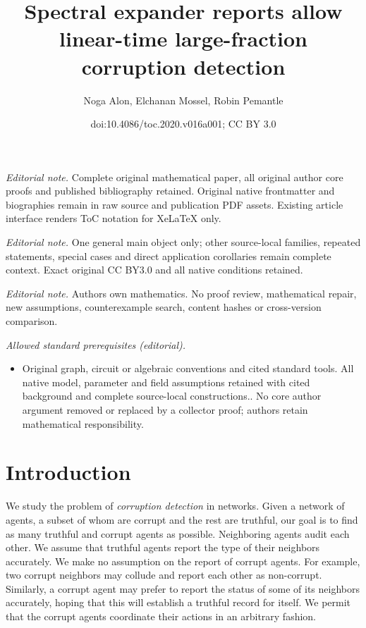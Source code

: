 \documentclass[11pt]{article}
\title{Spectral expander reports allow linear-time large-fraction corruption detection}
\author{Noga Alon, Elchanan Mossel, Robin Pemantle}
\date{doi:10.4086/toc.2020.v016a001; CC BY 3.0}
\numberwithin{equation}{section}
\theoremstyle{definition}
\theoremstyle{plain}
\begin{document}
\maketitle
\noindent\textit{Editorial note.} Complete original mathematical paper, all original author core proofs and published bibliography retained. Original native frontmatter and biographies remain in raw source and publication PDF assets. Existing article interface renders ToC notation for XeLaTeX only.\par\medskip
\noindent\textit{Editorial note.} One general main object only; other source-local families, repeated statements, special cases and direct application corollaries remain complete context. Exact original CC BY3.0 and all native conditions retained.\par\medskip
\noindent\textit{Editorial note.} Authors own mathematics. No proof review, mathematical repair, new assumptions, counterexample search, content hashes or cross-version comparison.\par\medskip
\noindent\textit{Allowed standard prerequisites (editorial).}\begin{itemize}
\item Original graph, circuit or algebraic conventions and cited standard tools. All native model, parameter and field assumptions retained with cited background and complete source-local constructions.. No core author argument removed or replaced by a collector proof; authors retain mathematical responsibility.
\end{itemize}\medskip
\section{Introduction}
We study the problem of 
%
%
 \emph{corruption detection} in networks. %
Given a network of agents, a subset of whom are 
corrupt and the rest are truthful, our goal is to %
find as many truthful and corrupt agents as possible. 
Neighboring agents audit each other. We assume that 
truthful  agents report the %
%
type  %
of their neighbors accurately. 
We make no assumption on the report of corrupt agents. 
For example, two corrupt neighbors may collude and report each other as
non-corrupt. Similarly, a corrupt agent may 
prefer to report the status of some of 
its neighbors accurately, hoping that this will establish a 
truthful record for itself. 
%
%
%
We permit that the corrupt agents    %
coordinate their actions in an arbitrary fashion. 
\end{document}

